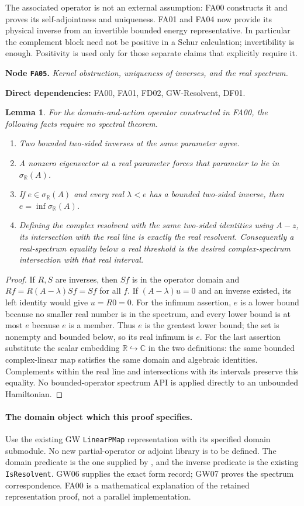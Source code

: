 \documentclass[11pt,a4paper]{article}
\newtheorem{lemma}[theorem]{Lemma}
\theoremstyle{remark}\newtheorem{remark}[theorem]{Remark}
\newcommand{\R}{\mathbb R}\newcommand{\C}{\mathbb C}\newcommand{\N}{\mathbb N}
\newcommand{\node}[3]{\par\Needspace{6\baselineskip}\smallskip\hypertarget{node:#1}{}\label{nodepage:#1}\noindent\textbf{Node \texttt{#1}.} \textit{#2.}\par\noindent\textbf{Direct dependencies:} #3.\par}
\newcommand{\sigR}{\sigma_{\R}}
\begin{document}
The associated operator is not an external assumption: FA00 constructs it and proves its self-adjointness and uniqueness. FA01 and FA04 now provide its physical inverse from an invertible bounded energy representative. In particular the complement block need not be positive in a Schur calculation; invertibility is enough. Positivity is used only for those separate claims that explicitly require it.


\node{FA05}{Kernel obstruction, uniqueness of inverses, and the real spectrum}{FA00, FA01, FD02, GW-Resolvent, DF01}
\begin{lemma}\label{lem:spectraldefinitions}
For the domain-and-action operator constructed in FA00, the following facts require no spectral theorem.
\begin{enumerate}
\item Two bounded two-sided inverses at the same parameter agree.
\item A nonzero eigenvector at a real parameter forces that parameter to lie in $\sigR(A)$.
\item If $e\in\sigR(A)$ and every real $\lambda<e$ has a bounded two-sided inverse, then $e=\inf\sigR(A)$.
\item Defining the complex resolvent with the same two-sided identities using $A-z$, its intersection with the real line is exactly the real resolvent. Consequently a real-spectrum equality below a real threshold is the desired complex-spectrum intersection with that real interval.
\end{enumerate}
\end{lemma}
\begin{proof}
If $R,S$ are inverses, then $Sf$ is in the operator domain and
$Rf=R(A-\lambda)Sf=Sf$ for all $f$. If $(A-\lambda)u=0$ and an inverse existed, its left identity would give $u=R0=0$. For the infimum assertion, $e$ is a lower bound because no smaller real number is in the spectrum, and every lower bound is at most $e$ because $e$ is a member. Thus $e$ is the greatest lower bound; the set is nonempty and bounded below, so its real infimum is $e$. For the last assertion substitute the scalar embedding $\R\hookrightarrow\C$ in the two definitions: the same bounded complex-linear map satisfies the same domain and algebraic identities. Complements within the real line and intersections with its intervals preserve this equality. No bounded-operator spectrum API is applied directly to an unbounded Hamiltonian.
\end{proof}

\paragraph{The domain object which this proof specifies.}
Use the existing GW \texttt{LinearPMap} representation with its specified domain submodule. No new partial-operator or adjoint library is to be defined. The domain predicate is the one supplied by , and the inverse predicate is the existing \texttt{IsResolvent}. GW06 supplies the exact form record; GW07 proves the spectrum correspondence. FA00 is a mathematical explanation of the retained representation proof, not a parallel implementation.
\end{document}
